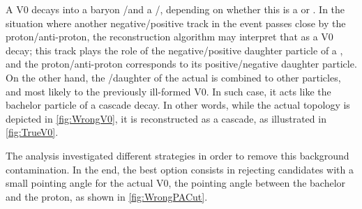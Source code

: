 A V0 decays into a baryon \proton/\pbar and a \rmPiMinus/\rmPiPlus, depending on whether this is a \rmLambda or \rmAlambda. In the situation where another negative/positive track in the event passes close by the proton/anti-proton, the reconstruction algorithm may interpret that as a V0 decay; this track plays the role of the negative/positive daughter particle of a \rmLambdaPM, and the proton/anti-proton corresponds to its positive/negative daughter particle. On the other hand, the \rmPiMinus/\rmPiPlus daughter of the actual \rmLambdaPM is combined to other particles, and most likely to the previously ill-formed V0. In such case, it acts like the bachelor particle of a cascade decay. In other words, while the actual topology is depicted in \fig\ref{fig:WrongV0}, it is reconstructed as a cascade, as illustrated in \fig\ref{fig:TrueV0}.

The analysis \cite{silvadealbuquerqueMultistrangeHadronsPb2019} investigated different strategies in order to remove this background contamination. In the end, the best option consists in rejecting candidates with a small pointing angle for the actual V0, \ie the pointing angle between the bachelor and the proton, as shown in \fig\ref{fig:WrongPACut}.


